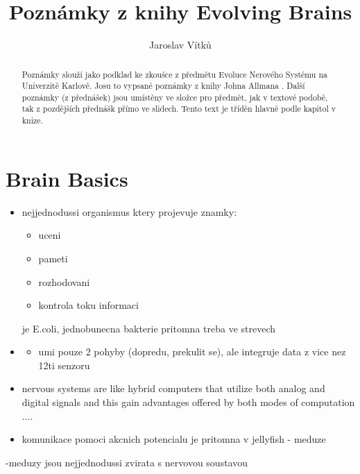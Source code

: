 \documentclass[journal,onecolumn]{IEEEtrancz}
\begin{document}
\title{Poznámky z knihy Evolving Brains}
\author{Jaroslav Vítků}

\maketitle

\begin{abstract}
Poznámky slouží jako podklad ke zkoušce z předmětu Evoluce Nerového Systému na Univerzitě Karlově. Josu to vypsané poznámky z knihy Johna Allmana \cite{kniha}. Další poznámky (z přednášek) jsou umístěny ve složce pro předmět, jak v textové podobě, tak z pozdějších přednášk přímo ve slidech. Tento text je tříděn hlavně podle kapitol v knize. 
\end{abstract}

\IEEEpeerreviewmaketitle



\section{Brain Basics}


\begin{itemize}
	\item nejjednodussi organismus ktery projevuje znamky:
	\begin{itemize}
		\item uceni
		\item pameti
		\item rozhodovani
		\item kontrola toku informaci
			\vspace{3mm}
	\end{itemize}
	je E.coli, jednobunecna bakterie pritomna treba ve strevech
		\item 
\begin{itemize}
		\begin{itemize}
			\item umi pouze 2 pohyby (dopredu, prekulit se), ale integruje data z vice nez 12ti senzoru
				\vspace{3mm}
		\end{itemize}

	\end{itemize}

	\item nervous systems are like hybrid computers that utilize both analog and digital signals and this gain advantages offered by both modes of computation ....
		\vspace{3mm}
	\item komunikace pomoci akcnich potencialu je pritomna v jellyfish - meduze
\end{itemize}
 	-meduzy jsou nejjednodussi zvirata s nervovou soustavou
\end{document}
